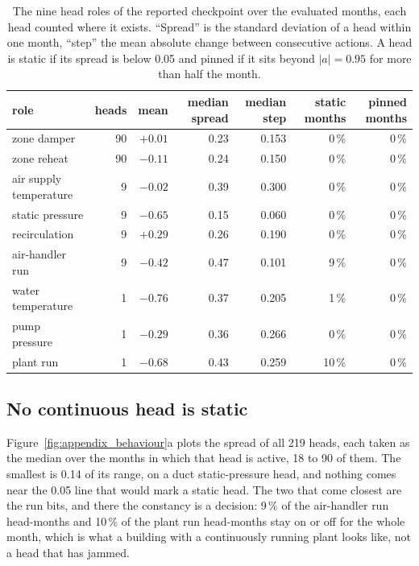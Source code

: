 \documentclass{article}
\begin{document}
\begin{table}[h!]
\centering
\footnotesize
\setlength{\tabcolsep}{4pt}
\begin{tabular}{@{}lrrrrrr@{}}
\toprule
role & heads & mean & median spread & median step & static months & pinned months \\
\midrule
zone damper & 90 & $+0.01$ & 0.23 & 0.153 & 0\,\% & 0\,\% \\
zone reheat & 90 & $-0.11$ & 0.24 & 0.150 & 0\,\% & 0\,\% \\
air supply temperature & 9 & $-0.02$ & 0.39 & 0.300 & 0\,\% & 0\,\% \\
static pressure & 9 & $-0.65$ & 0.15 & 0.060 & 0\,\% & 0\,\% \\
recirculation & 9 & $+0.29$ & 0.26 & 0.190 & 0\,\% & 0\,\% \\
air-handler run & 9 & $-0.42$ & 0.47 & 0.101 & 9\,\% & 0\,\% \\
water temperature & 1 & $-0.76$ & 0.37 & 0.205 & 1\,\% & 0\,\% \\
pump pressure & 1 & $-0.29$ & 0.36 & 0.266 & 0\,\% & 0\,\% \\
plant run & 1 & $-0.68$ & 0.43 & 0.259 & 10\,\% & 0\,\% \\
\bottomrule
\end{tabular}
\vspace{4pt}
\caption{The nine head roles of the reported checkpoint over the evaluated months, each head counted where it exists. ``Spread'' is the standard deviation of a head within one month, ``step'' the mean absolute change between consecutive actions. A head is static if its spread is below 0.05 and pinned if it sits beyond $|a|=0.95$ for more than half the month.}
\label{tab:app_heads}
\end{table}

\subsection{No continuous head is static}

Figure~\ref{fig:appendix_behaviour}a plots the spread of all 219 heads, each taken as the median over the months in which that head is active, 18 to 90 of them. The smallest is 0.14 of its range, on a duct static-pressure head, and nothing comes near the 0.05 line that would mark a static head. The two that come closest are the run bits, and there the constancy is a decision: 9\,\% of the air-handler run head-months and 10\,\% of the plant run head-months stay on or off for the whole month, which is what a building with a continuously running plant looks like, not a head that has jammed.
\end{document}
